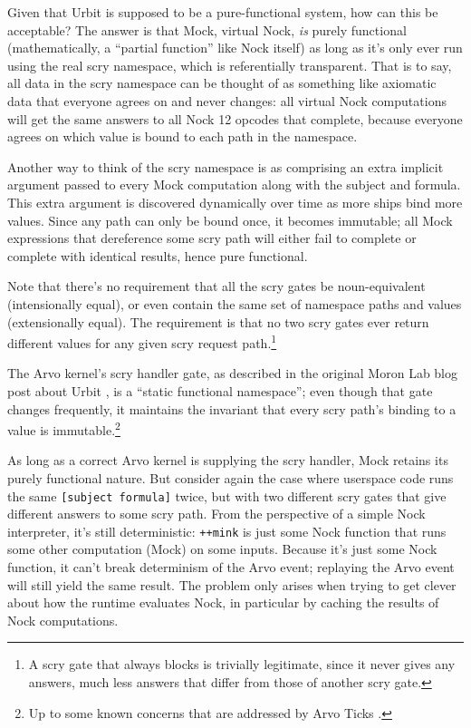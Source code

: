 \documentclass[twoside]{article}
\begin{document}
Given that Urbit is supposed to be a pure-functional system, how can this be acceptable?  The answer is that Mock, virtual Nock, \emph{is} purely functional (mathematically, a ``partial function'' like Nock itself) as long as it's only ever run using the real scry namespace, which is referentially transparent.  That is to say, all data in the scry namespace can be thought of as something like axiomatic data that everyone agrees on and never changes:  all virtual Nock computations will get the same answers to all Nock 12 opcodes that complete, because everyone agrees on which value is bound to each path in the namespace.

Another way to think of the scry namespace is as comprising an extra implicit argument passed to every Mock computation along with the subject and formula.  This extra argument is discovered dynamically over time as more ships bind more values.  Since any path can only be bound once, it becomes immutable; all Mock expressions that dereference some scry path will either fail to complete or complete with identical results, hence pure functional.

Note that there's no requirement that all the scry gates be noun-equivalent (intensionally equal), or even contain the same set of namespace paths and values (extensionally equal). The requirement is that no two scry gates ever return different values for any given scry request path.\footnote{A scry gate that always blocks is trivially legitimate, since it never gives any answers, much less answers that differ from those of another scry gate.}

\sloppy
The Arvo kernel's scry handler gate, as described in the original Moron Lab blog post about Urbit \citep{Yarvin2010}, is a ``static functional namespace''; even though that gate changes frequently, it maintains the invariant that every scry path's binding to a value is immutable.\footnote{Up to some known concerns that are addressed by Arvo Ticks .}

As long as a correct Arvo kernel is supplying the scry handler, Mock retains its purely functional nature.  But consider again the case where userspace code runs the same \lstinline[style=inlinecode]{[subject formula]} twice, but with two different scry gates that give different answers to some scry path. From the perspective of a simple Nock interpreter, it's still deterministic:  \lstinline[style=inlinecode]{++mink} is just some Nock function that runs some other computation (Mock) on some inputs.  Because it's just some Nock function, it can't break determinism of the Arvo event; replaying the Arvo event will still yield the same result.  The problem only arises when trying to get clever about how the runtime evaluates Nock, in particular by caching the results of Nock computations.
\end{document}
